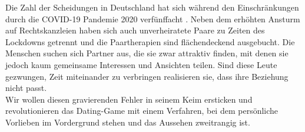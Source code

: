 
Die Zahl der Scheidungen in Deutschland hat sich während den Einschränkungen durch die COVID-19 Pandemie 2020 verfünffacht \cite{scheidungen}. Neben dem erhöhten Ansturm auf Rechtskanzleien haben sich auch unverheiratete Paare zu Zeiten des Lockdowns getrennt und die Paartherapien sind flächendeckend ausgebucht. Die Menschen suchen sich Partner aus, die sie zwar attraktiv finden, mit denen sie jedoch kaum gemeinsame Interessen und Ansichten teilen. Sind diese Leute gezwungen, Zeit miteinander zu verbringen realisieren sie, dass ihre Beziehung nicht passt.\\
Wir wollen diesen gravierenden Fehler in seinem Keim ersticken und revolutionieren das Dating-Game mit einem Verfahren, bei dem persönliche Vorlieben im Vordergrund stehen und das Aussehen zweitrangig ist.


